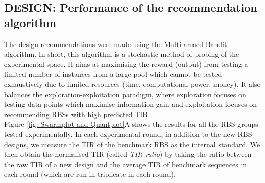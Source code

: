 \documentclass{article}
\begin{document}
\subsection{DESIGN: Performance of the recommendation algorithm}
\label{sec:ucb-results}

The design recommendations were made using the Multi-armed Bandit algorithm.
In short, this algorithm is a stochastic method of probing of the experimental space. 
It aims at maximising the reward (output) from testing a limited number of instances from a large pool which cannot be tested exhaustively due to limited resources (time, computational power, money).
It also balances the exploration-exploitation paradigm, where exploration focuses on testing data points which maximise information gain and exploitation focuses on recommending RBSs with high predicted TIR.\\

Figure \ref{fig: Swarmplot and Quantplot}A shows the results for all the RBS groups tested experimentally. 
In each experimental round, in addition to the new RBS designs, we measure the TIR of the benchmark RBS as the internal standard. 
We then obtain the normalised TIR (called \textit{TIR ratio}) by taking the ratio between the raw TIR of a new design and the average TIR of benchmark sequences in each round (which are run in triplicate in each round).\\
\end{document}
